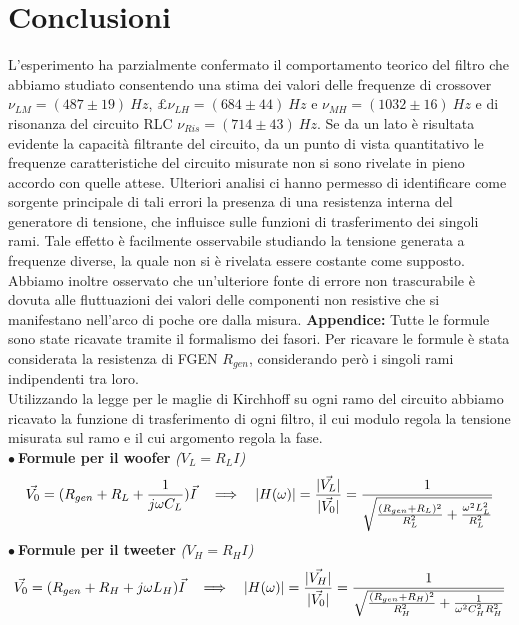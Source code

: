 \documentclass[]{article}
\begin{document}
\section{Conclusioni} 
L'esperimento ha parzialmente confermato il comportamento teorico del filtro che abbiamo studiato consentendo una stima dei valori delle frequenze di crossover $ \nu_{LM}=(487\pm19)\:Hz$,  $£ \nu_{LH}=(684\pm44)\:Hz $ e $ \nu_{MH}=(1032\pm16)\:Hz $ e di risonanza del circuito RLC  $ \nu_{Ris}=(714\pm43)\: Hz$. Se da un lato è risultata evidente la capacità filtrante del circuito, da un punto di vista quantitativo le frequenze caratteristiche del circuito misurate non si sono rivelate in pieno accordo con quelle attese. Ulteriori analisi ci hanno permesso di identificare come sorgente principale di tali errori la presenza di una resistenza interna del generatore di tensione, che influisce sulle funzioni di trasferimento dei singoli rami. Tale effetto è facilmente osservabile studiando la tensione generata a frequenze diverse, la quale non si è rivelata essere costante come supposto. Abbiamo inoltre osservato che un'ulteriore fonte di errore non trascurabile è dovuta alle fluttuazioni dei valori delle componenti non resistive che si manifestano nell'arco di poche ore dalla misura.
\newpage
{\large\textbf{Appendice: }}
Tutte le formule sono state ricavate tramite il formalismo dei fasori. Per ricavare le formule è stata considerata la resistenza di FGEN $ R_{gen} $, considerando però i singoli rami indipendenti tra loro.\\
Utilizzando la legge per le maglie di Kirchhoff su ogni ramo del circuito abbiamo ricavato la funzione di trasferimento di ogni filtro, il cui modulo regola la tensione misurata sul ramo e il cui argomento regola la fase.\\
$ \bullet \: $\textbf{Formule per il woofer} {\small\emph{($V_L=R_L I$)}}
\begin{equation}\label{V_{L}}
	\vec{V_0}=(R_{gen}+R_L+ \frac{1}{j\omega C_L})\vec{I}\quad  \Longrightarrow \quad \lvert H(\omega)\rvert=\frac{	\lvert \vec{ V_{L}} \rvert}{\lvert \vec{ V_{0}} \rvert}=\frac{1}{\sqrt{\frac{(R_{gen}+R_{L})^2}{R_{L}^{2}}+\frac{\omega^{2}L_{L}^{2}}{R_{L}^{2}}}}
\end{equation}
$ \bullet \: $\textbf{Formule per il tweeter} {\small\emph{($V_H=R_H I$)}}
\begin{equation}\label{V_{H}}
\vec{V_0}=(R_{gen}+R_H+j\omega L_H)\vec{I} \quad \Longrightarrow \quad \lvert H(\omega)\rvert=\frac{	\lvert \vec{V_H} \rvert}{\lvert \vec{V_0}\rvert} =\frac{1}{\sqrt{\frac{(R_{gen}+R_{H})^{2}}{R_{H}^{2}}+\frac{1}{\omega^{2}C_{H}^{2}R_{H}^{2}}}}
\end{equation}
\end{document}
